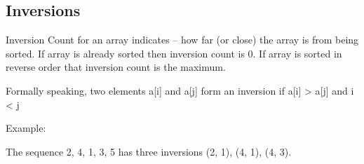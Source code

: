 \documentclass[10pt,letterpaper,twocolumn,twosided]{article}
\newcommand{\codigofuente}[1]{

\dotfill
}
\begin{document}


\subsection{Inversions}

Inversion Count for an array indicates – how far (or close) the array is from being sorted. If array is already sorted then inversion count is 0. If array is sorted in reverse order that inversion count is the maximum.

Formally speaking, two elements a[i] and a[j] form an inversion if a[i] > a[j] and i < j

Example:

The sequence 2, 4, 1, 3, 5 has three inversions (2, 1), (4, 1), (4, 3).

\codigofuente{src/misc/inversions.cpp}
\end{document}
